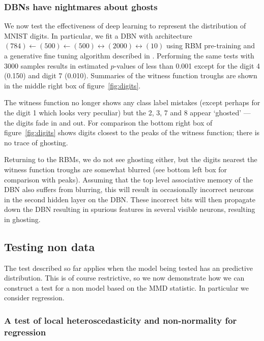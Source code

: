 \subsubsection{DBNs have nightmares about ghosts}

We now test the effectiveness of deep learning to represent the distribution of MNIST digits.
In particular, we fit a DBN with architecture $(784)\leftarrow(500)\leftarrow(500)\leftrightarrow(2000)\leftrightarrow(10)$ using RBM pre-training and a generative fine tuning algorithm described in \cite{Hinton2006-yw}.
Performing the same tests with 3000 samples results in estimated $p$-values of less than 0.001 except for the digit 4 (0.150) and digit 7 (0.010).
Summaries of the witness function troughs are shown in the middle right box of figure~\ref{fig:digits}.

The witness function no longer shows any class label mistakes (except perhaps for the digit 1 which looks very peculiar) but the 2, 3, 7 and 8 appear `ghosted' --- the digits fade in and out.
For comparison the bottom right box of figure~\ref{fig:digits} shows digits closest to the peaks of the witness function; there is no trace of ghosting.

Returning to the RBMs, we do not see ghosting either, but the digits nearest the witness function troughs are somewhat blurred (see bottom left box for comparison with peaks).
Assuming that the top level associative memory of the DBN also suffers from blurring, this will result in occasionally incorrect neurons in the second hidden layer on the DBN.
These incorrect bits will then propagate down the DBN resulting in spurious features in several visible neurons, resulting in ghosting.

\subsection{Testing non \iid data}
\label{sec:non_iid}

The test described so far applies when the model being tested has an \iid predictive distribution.
This is of course restrictive, so we now demonstrate how we can construct a test for a non \iid model based on the MMD statistic.
In particular we consider regression.

\subsubsection{A test of local heteroscedasticity and non-normality for regression}

